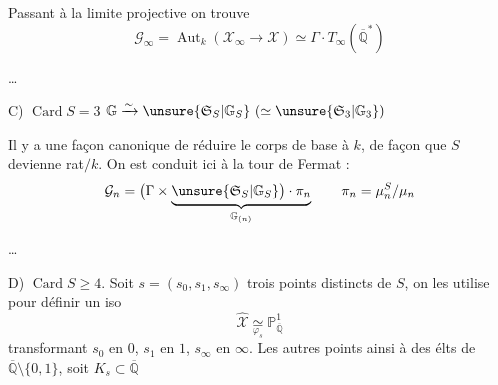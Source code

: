 Passant à la limite projective on trouve
\[
\mathcal G_\infty=\operatorname{Aut}_k(\mathcal X_\infty\to\mathcal X)\simeq\Gamma\cdot T_\infty(\overline{\mathbb Q}^{*})
\]

\ldots

C) $\operatorname{Card}S=3$\qquad
$\mathbb G\xrightarrow{\sim}\unsure{\mathfrak S_S|\mathbb G_S}\ (\simeq\unsure{\mathfrak S_3|\mathbb G_3})$

Il y a une façon canonique de réduire le corps de base à $k$, de façon que $S$ devienne rat$/k$. On est conduit ici à la tour de Fermat :
\[
\mathcal G_n=\bigl(\Gamma\times
\underbrace{\unsure{\mathfrak S_S|\mathbb G_S}\bigr)\cdot\pi_n}_{\mathbb G_{(n)}}
\qquad \pi_n=\mu_n^S/\mu_n
\]

\ldots

D) $\operatorname{Card}S\geq4$. Soit $s=(s_0,s_1,s_\infty)$  trois points distincts de $S$, on les utilise pour définir un iso
\[
\widehat{\mathcal X}\underset{\varphi_s}{\simeq}\mathbb P^1_{\overline{\mathbb Q}}
\]
transformant $s_0$ en $0$, $s_1$ en $1$, $s_\infty$ en $\infty$. Les autres points   ainsi à des élts de $\overline{\mathbb Q}\setminus\{0,1\}$, soit $K_s\subset\overline{\mathbb Q}$
